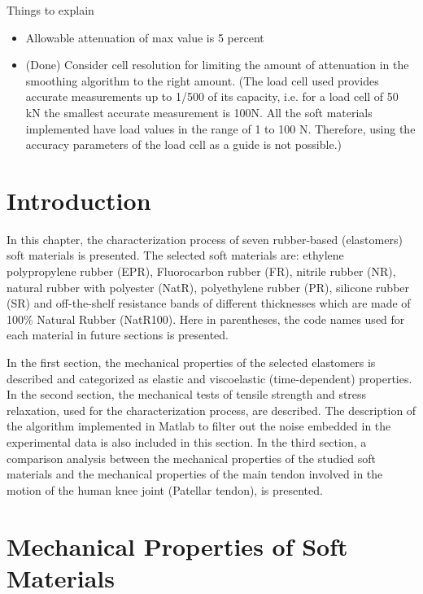 Things to explain
\begin{itemize}
    \item Allowable attenuation of max value is 5 percent
    \item (Done) Consider cell resolution for limiting the amount of attenuation in the smoothing algorithm to the right amount. (The load cell used provides accurate measurements up to 1/500 of its capacity, i.e. for a load cell of 50 kN the smallest accurate measurement is 100N. All the soft materials implemented have load values in the range of 1 to 100 N. Therefore, using the accuracy parameters of the load cell as a guide is not possible.)
\end{itemize}

\section{Introduction}

In this chapter, the characterization process of seven rubber-based (elastomers) soft materials is presented. The selected soft materials are: ethylene polypropylene rubber (EPR), Fluorocarbon rubber (FR), nitrile rubber (NR), natural rubber with polyester (NatR),  polyethylene rubber (PR), silicone rubber (SR) and  off-the-shelf resistance bands of different thicknesses which are made of 100\% Natural Rubber (NatR100). Here in parentheses, the code names used for each material in future sections is presented.

In the first section, the mechanical properties of the selected elastomers is described and categorized as elastic and viscoelastic (time-dependent) properties. In the second section, the mechanical tests of tensile strength and stress relaxation, used for the characterization process, are described. The description of the algorithm implemented in Matlab to filter out the noise embedded in the experimental data is also included in this section. In the third section, a comparison analysis between the mechanical properties of the studied soft materials and the mechanical properties of the main tendon involved in the motion of the human knee joint (Patellar tendon), is presented.

\section{Mechanical Properties of Soft Materials} \label{mechprop}

